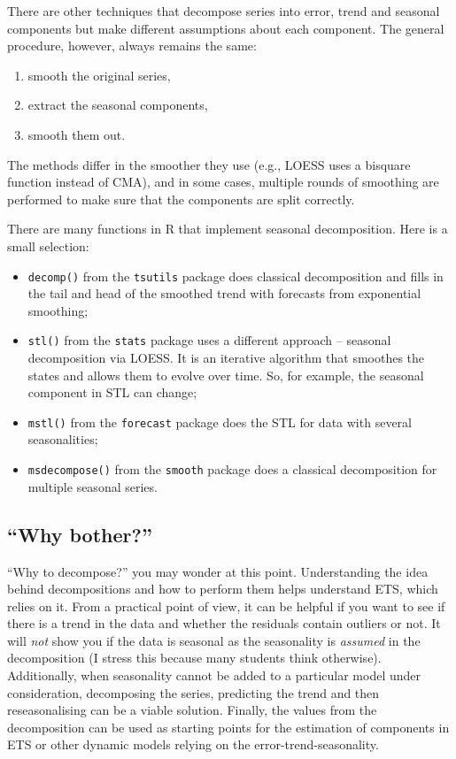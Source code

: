 \documentclass[
]{book}
\providecommand{\tightlist}{%
  \setlength{\itemsep}{0pt}\setlength{\parskip}{0pt}}
\theoremstyle{definition}
\theoremstyle{definition}
\theoremstyle{definition}
\theoremstyle{definition}
\theoremstyle{remark}
\begin{document}
There are other techniques that decompose series into error, trend and seasonal components but make different assumptions about each component. The general procedure, however, always remains the same:

\begin{enumerate}
\def\labelenumi{\arabic{enumi}.}
\tightlist
\item
  smooth the original series,
\item
  extract the seasonal components,
\item
  smooth them out.
\end{enumerate}

The methods differ in the smoother they use (e.g., LOESS uses a bisquare function instead of CMA), and in some cases, multiple rounds of smoothing are performed to make sure that the components are split correctly.

There are many functions in R that implement seasonal decomposition. Here is a small selection:

\begin{itemize}
\tightlist
\item
  \texttt{decomp()} from the \texttt{tsutils} package does classical decomposition and fills in the tail and head of the smoothed trend with forecasts from exponential smoothing;
\item
  \texttt{stl()} from the \texttt{stats} package uses a different approach -- seasonal decomposition via LOESS. It is an iterative algorithm that smoothes the states and allows them to evolve over time. So, for example, the seasonal component in STL can change;
\item
  \texttt{mstl()} from the \texttt{forecast} package does the STL for data with several seasonalities;
\item
  \texttt{msdecompose()} from the \texttt{smooth} package does a classical decomposition for multiple seasonal series.
\end{itemize}

\hypertarget{why-bother}{%
\subsection{``Why bother?''}\label{why-bother}}

``Why to decompose?'' you may wonder at this point. Understanding the idea behind decompositions and how to perform them helps understand ETS, which relies on it. From a practical point of view, it can be helpful if you want to see if there is a trend in the data and whether the residuals contain outliers or not. It will \emph{not} show you if the data is seasonal as the seasonality is \emph{assumed} in the decomposition (I stress this because many students think otherwise). Additionally, when seasonality cannot be added to a particular model under consideration, decomposing the series, predicting the trend and then reseasonalising can be a viable solution. Finally, the values from the decomposition can be used as starting points for the estimation of components in ETS or other dynamic models relying on the error-trend-seasonality.
\end{document}
